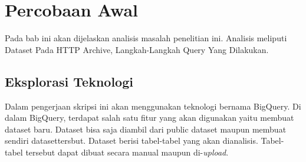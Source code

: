 \chapter{Percobaan Awal}
\label{chap:percobaan_awal}
Pada bab ini akan dijelaskan analisis masalah penelitian ini. Analisis meliputi Dataset Pada HTTP Archive, Langkah-Langkah Query Yang Dilakukan.

\section{Eksplorasi Teknologi}
Dalam pengerjaan skripsi ini akan menggunakan teknologi bernama BigQuery. Di dalam BigQuery, terdapat salah satu fitur yang akan digunakan yaitu membuat dataset baru. Dataset bisa saja diambil dari public dataset maupun membuat sendiri datasettersbut. Dataset berisi tabel-tabel yang akan dianalisis. Tabel-tabel tersebut dapat dibuat secara manual maupun di-\textit{upload}.

